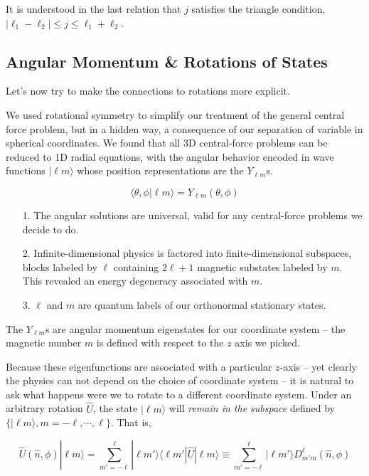 It is understood in the last relation that $j$ satisfies the triangle
condition, $|\ell_1-\ell_2| \leq j \leq \ell_1+\ell_2$. 

\subsection{Angular Momentum \& Rotations of States}

Let’s now try to make the connections to rotations
more explicit.

We used rotational symmetry to simplify our treatment of the general central force problem, but in
a hidden way, a consequence of our separation of variable in spherical coordinates. We found that
all 3D central-force problems can be reduced to 1D radial equations, with the angular behavior
encoded in wave functions $|\ell m\rangle$ whose position representations are the
$Y_{\ell m}$s.

\[
  \langle \theta, \phi | \ell m\rangle = Y_{\ell m}(\theta, \phi)
\] 

\begin{itemize}
  \item[1.] The angular solutions are universal, valid for any central-force
    problems we decide to do.
  \item[2.] Infinite-dimensional physics is factored into finite-dimensional
    subspaces, blocks labeled by $\ell$ containing $2\ell+1$ magnetic substates
    labeled by $m$. This revealed an energy degeneracy associated with $m$. 
  \item[3.] $\ell$ and $m$ are quantum labels of our orthonormal stationary
    states.
\end{itemize}


The $Y_{\ell m}$s are angular momentum eigenstates for our coordinate system --
the magnetic number $m$ is defined with respect to the $z$ axis we picked.

Because these eigenfunctions are associated with a particular $z$-axis -- yet
clearly the physics can not depend on the choice of coordinate system -- it is
natural to ask what happens were we to rotate to a different coordinate system.
Under an arbitrary rotation $\hat{U}$, the state $|\ell m\rangle$ will
\textit{remain in the subspace} defined by $\{|\ell m\rangle, m = -\ell,
\cdots, \ell\}$. That is, 

\[
\hat{U}(\hat{n}, \phi)|\ell m\rangle = \sum_{m' = -\ell}^{\ell} |\ell m'\rangle
\langle \ell m' | \hat{U} | \ell m \rangle \equiv \sum_{m' = -\ell}^{\ell}
|\ell m'\rangle D_{m'm}^\ell (\hat{n}, \phi )
\] \vspace{3px}

